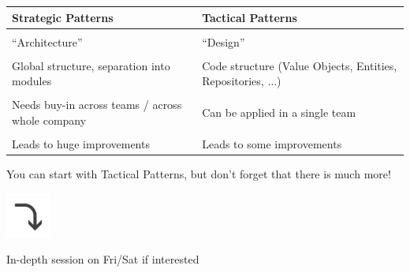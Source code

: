 \begin{frame}[fragile]{\de{}}

\begin{tabularx}{\textwidth}{X|X}
\textbf{Strategic Patterns} & \textbf{Tactical Patterns} \\
\hline
\\[-0.8em]

``Architecture'' & ``Design'' \\
&\\[-0.5em]
Global structure, separation into modules & Code structure (Value Objects, Entities, Repositories, $\ldots$) \\
&\\[-0.5em]
Needs buy-in across teams / across whole company & Can be applied in a single team \\
&\\[-0.5em]
Leads to huge improvements & Leads to some improvements \\
\end{tabularx}

\vspace{2em}

You can start with Tactical Patterns, but don't forget that there is much more!

\end{frame}

\begin{frame}[fragile]{}

\hspace{8em}  \includegraphics[width=4em]{./arrow.png}

\end{frame}

\begin{frame}[fragile]{}

\end{frame}


\begin{frame}[fragile]{\de{}}

{\large
In-depth session on Fri/Sat if interested 
}

\end{frame}
